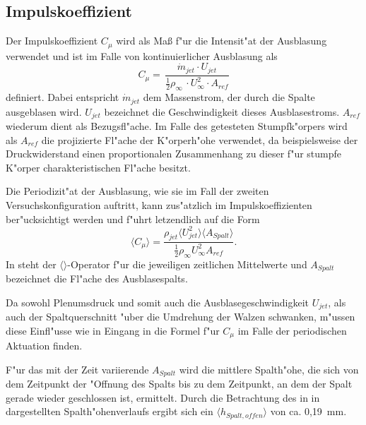 \subsection{Impulskoeffizient}
Der Impulskoeffizient $C_{\mu}$ wird als Ma\ss{} f"ur die Intensit"at der Ausblasung verwendet und ist im Falle von kontinuierlicher Ausblasung als 
\begin{equation}
	\label{eq: Def-momentum-coeff}
	C_{\mu} = \,\frac{\dot{m}_{jet} \cdot U_{jet}}{\frac{1}{2}\rho_{\infty}\, \cdot U^2_{\infty} \cdot A_{ref}}
\end{equation}
definiert\cite{ElSayedM..2018}. 
Dabei entspricht $\dot{m}_{jet}$ dem Massenstrom, der durch die Spalte ausgeblasen wird. $U_{jet}$ bezeichnet die Geschwindigkeit dieses Ausblasestroms.
$A_{ref}$ wiederum dient als Bezugsfl"ache. Im Falle des getesteten Stumpfk"orpers wird als $A_{ref}$ die projizierte Fl"ache der K"orperh"ohe verwendet, da beispielsweise der Druckwiderstand einen proportionalen Zusammenhang zu dieser f"ur stumpfe K"orper charakteristischen Fl"ache besitzt.  %

Die Periodizit"at der Ausblasung, wie sie im Fall der zweiten Versuchskonfiguration auftritt, kann zus"atzlich im Impulskoeffizienten ber"ucksichtigt werden und f"uhrt letzendlich auf die Form \cite{Chabert.2014}
\begin{equation}
	\label{eq:momentum-coeff-oscill}
	\langle{C_{\mu}}\rangle = \frac{\rho_{jet}\langle{U^2_{jet}}\rangle \langle{A_{Spalt}}\rangle} {\frac{1}{2}\rho_{\infty}U^2_{\infty}A_{ref}}.	
\end{equation}
In  steht der $\langle{}\rangle$-Operator f"ur die jeweiligen zeitlichen Mittelwerte und $A_{Spalt}$ bezeichnet die Fl"ache des Ausblasespalts.

Da sowohl Plenumsdruck und somit auch die Ausblasegeschwindigkeit $U_{jet}$, als auch der Spaltquerschnitt "uber die Umdrehung der Walzen schwanken, m"ussen diese Einfl"usse wie in  Eingang in die Formel f"ur $C_{\mu}$ im Falle der periodischen Aktuation finden.

F"ur das mit der Zeit variierende $A_{Spalt}$   wird die mittlere Spalth"ohe, die sich von dem Zeitpunkt der "Offnung des Spalts bis zu dem Zeitpunkt, an dem der Spalt gerade wieder geschlossen ist, ermittelt.  
Durch die Betrachtung des in  in  dargestellten Spalth"ohenverlaufs ergibt sich ein $\langle{h_{Spalt,offen}}\rangle$ von ca. 0,19 \,mm.


